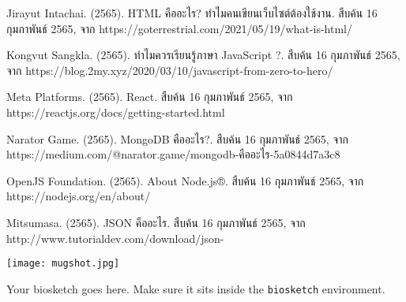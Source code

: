 \documentclass[semifinal,survey]{cpecmu}
\author{นายเจษฎา จินะกะ}{Jetsada Jinaka}{620612144}
\author{นายเอื้อบุญ เรือนคำฟู}{Aueboon Ruanekamfu}{620612170}
\begin{document}


\pagestyle{empty}\cleardoublepage
\normalspacing \setcounter{page}{1}  \pagestyle{cpecmu}





\ifproject

\fi

\begin{thebibliography}{1}
   
  Jirayut Intachai. (2565). HTML คืออะไร? ทำไมคนเขียนเว็บไซต์ต้องใช้งาน. สืบค้น 16 กุมภาพันธ์ 2565,
  จาก https://goterrestrial.com/2021/05/19/what-is-html/

  Kongvut Sangkla. (2565). ทำไมควรเรียนรู้ภาษา JavaScript ?. สืบค้น 16 กุมภาพันธ์ 2565,
  จาก https://blog.2my.xyz/2020/03/10/javascript-from-zero-to-hero/

  Meta Platforms. (2565).  React. สืบค้น 16 กุมภาพันธ์ 2565,
  จาก https://reactjs.org/docs/getting-started.html
  
  Narator Game. (2565). MongoDB คืออะไร?. สืบค้น 16 กุมภาพันธ์ 2565,
  จาก https://medium.com/@narator.game/mongodb-คืออะไร-5a0844d7a3c8
  
  OpenJS Foundation. (2565).  About Node.js®. สืบค้น 16 กุมภาพันธ์ 2565,
  จาก https://nodejs.org/en/about/
  
  Mitsumasa. (2565). JSON คืออะไร. สืบค้น 16 กุมภาพันธ์ 2565,
  จาก http://www.tutorialdev.com/download/json-%

\end{thebibliography}

\ifproject
\appendix


\ifglossary\glossarypage\fi

\ifindex\indexpage\fi

\begin{biosketch}
\begin{center}
  \texttt{[image: mugshot.jpg]}
\end{center}
Your biosketch goes here. Make sure it sits inside
the \texttt{biosketch} environment.
\end{biosketch}
\fi %
\end{document}
